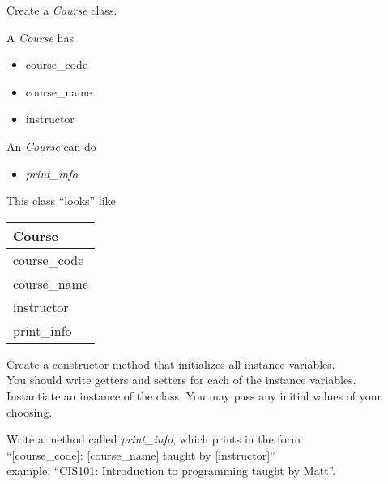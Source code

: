 
	\item Create a \textit{Course} class.\\
	\begin{minipage}{.6\textwidth}
		A \textit{Course} has
		\begin{itemize}
			\item course\_code 
			\item course\_name
			\item instructor	
		\end{itemize}

		An \textit{Course} can do
		\begin{itemize}
			\item \textit{print\_info}
		\end{itemize}	
	\end{minipage}
	\begin{minipage}{.4\textwidth}
		This class ``looks'' like 
				
		\vspace*{1em}
		\begin{tabular}{|l|}
			\hline Course\\ \hline
			course\_code\\ course\_name\\ instructor\\ \hline
			print\_info\\  \hline
		\end{tabular}
	\end{minipage}

	\vspace*{2ex}
	Create a constructor method that initializes all instance variables.\\
	You should write getters and setters for each of the instance variables.\\
	Instantiate an instance of the class. You may pass any initial values of your choosing.

	Write a method called \textit{print\_info}, which prints in the form \\
		\tab \tab \tab ``[course\_code]: [course\_name] taught by [instructor]''\\
	example. ``CIS101: Introduction to programming taught by Matt''.\\



